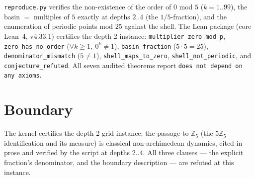 \documentclass[11pt]{article}
\begin{document}
\texttt{reproduce.py} verifies the non-existence of the order of $0$
mod $5$ ($k = 1..99$), the basin $=$ multiples of $5$ exactly at
depths $2..4$ (the $1/5$-fraction), and the enumeration of periodic
points mod $25$ against the shell.  The Lean package (core Lean~4,
v4.33.1) certifies the depth-2 instance: \texttt{multiplier\_zero\_mod\_p},
\texttt{zero\_has\_no\_order} ($\forall k \ge 1,\ 0^k \ne 1$),
\texttt{basin\_fraction} ($5 \cdot 5 = 25$),
\texttt{denominator\_mismatch} ($5 \ne 1$),
\texttt{shell\_maps\_to\_zero}, \texttt{shell\_not\_periodic}, and
\texttt{conjecture\_refuted}.  All seven audited theorems report
\texttt{does not depend on any axioms}.

\section{Boundary}

The kernel certifies the depth-2 grid instance; the passage to
$\mathbb{Z}_5$ (the $5\mathbb{Z}_5$ identification and its measure)
is classical non-archimedean dynamics, cited in prose and verified
by the script at depths $2..4$.  All three clauses --- the explicit
fraction's denominator, and the boundary description --- are
refuted at this instance.
\end{document}
